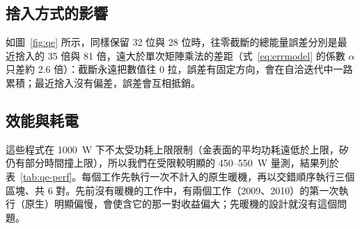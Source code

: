 \subsection{捨入方式的影響}\label{sec:sci-rounding}

如圖~\ref{fig:qe} 所示，同樣保留 32 位與 28 位時，往零截斷的總能量誤差分別是最近捨入的 35 倍與 81 倍，遠大於單次矩陣乘法的差距（式~\eqref{eq:errmodel} 的係數 $\alpha$ 只差約 2.6 倍）：截斷永遠把數值往 0 拉，誤差有固定方向，會在自洽迭代中一路累積；最近捨入沒有偏差，誤差會互相抵銷。

\subsection{效能與耗電}\label{sec:sci-perf}

這些程式在 1000~W 下不太受功耗上限限制（金表面的平均功耗遠低於上限，矽仍有部分時間撞上限），所以我們在受限較明顯的 450–550~W 量測，結果列於表~\ref{tab:qe-perf}。每個工作先執行一次不計入的原生暖機，再以交錯順序執行三個區塊、共 6 對。先前沒有暖機的工作中，有兩個工作（2009、2010）的第一次執行（原生）明顯偏慢，會使含它的那一對收益偏大；先暖機的設計就沒有這個問題。

